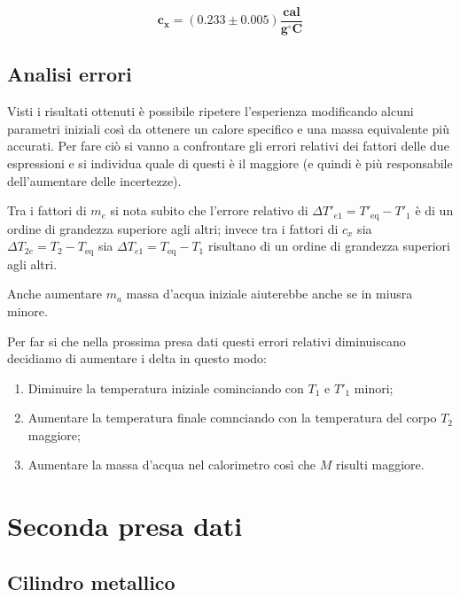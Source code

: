 \documentclass{article}
\begin{document}
	\[ 
	\boxed{\boldsymbol{c_{x} = (0.233 \pm 0.005) \frac{\text{cal}}{g ^\circ C}}}
	\]
	
	\subsection{Analisi errori}
	Visti i risultati ottenuti è possibile ripetere l'esperienza modificando alcuni parametri iniziali così da ottenere un calore specifico e una massa equivalente più accurati. Per fare ciò si vanno a confrontare gli errori relativi dei fattori delle due espressioni e si individua quale di questi è il maggiore (e quindi è più responsabile dell'aumentare delle incertezze).
	
	Tra i fattori di \(m_{e}\) si nota subito che l'errore relativo di \(\Delta T'_{e1} = T'_{\text{eq}} - T'_{1}\) è di un ordine di grandezza superiore agli altri; invece tra i fattori di \(c_{x}\) sia \(\Delta T_{2e}=T_{2} - T_{\text{eq}}\) sia \(\Delta T_{e1} = T_{\text{eq}} - T_{1}\) risultano di un ordine di grandezza superiori agli altri. 
	
	Anche aumentare \(m_{a}\) massa d'acqua iniziale aiuterebbe anche se in miusra minore.
	
	Per far si che nella prossima presa dati questi errori relativi diminuiscano decidiamo di aumentare i delta in questo modo:
	\begin{enumerate}
		\item Diminuire la temperatura iniziale cominciando con \(T_{1}\) e \(T'_{1}\) minori;
		\item Aumentare la temperatura finale comnciando con la temperatura del corpo \(T_{2}\) maggiore;
		\item Aumentare la massa d'acqua nel calorimetro così che \(M\) risulti maggiore.
	\end{enumerate}
	
	
	
	
	\newpage
	\section{Seconda presa dati}
	\subsection{Cilindro metallico}
	
\end{document}
